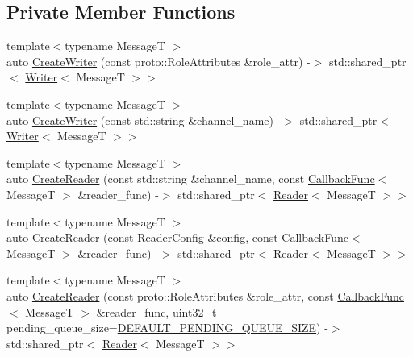 \subsection*{Private Member Functions}
\begin{DoxyCompactItemize}
\item 
{\footnotesize template$<$typename Message\-T $>$ }\\auto \hyperlink{classapollo_1_1cyber_1_1NodeChannelImpl_aa1befa9b25159bfd054258855d6287ef}{Create\-Writer} (const proto\-::\-Role\-Attributes \&role\-\_\-attr) -\/$>$ std\-::shared\-\_\-ptr$<$ \hyperlink{classapollo_1_1cyber_1_1Writer}{Writer}$<$ Message\-T $>$$>$
\item 
{\footnotesize template$<$typename Message\-T $>$ }\\auto \hyperlink{classapollo_1_1cyber_1_1NodeChannelImpl_ace079e0f685ee7a5b970c0e8a9ca187a}{Create\-Writer} (const std\-::string \&channel\-\_\-name) -\/$>$ std\-::shared\-\_\-ptr$<$ \hyperlink{classapollo_1_1cyber_1_1Writer}{Writer}$<$ Message\-T $>$$>$
\item 
{\footnotesize template$<$typename Message\-T $>$ }\\auto \hyperlink{classapollo_1_1cyber_1_1NodeChannelImpl_a4f0027a3b81bddc8f2c498998e00840e}{Create\-Reader} (const std\-::string \&channel\-\_\-name, const \hyperlink{namespaceapollo_1_1cyber_ac2b119de9ef52dbfcee3b6e8d497adc4}{Callback\-Func}$<$ Message\-T $>$ \&reader\-\_\-func) -\/$>$ std\-::shared\-\_\-ptr$<$ \hyperlink{classapollo_1_1cyber_1_1Reader}{Reader}$<$ Message\-T $>$$>$
\item 
{\footnotesize template$<$typename Message\-T $>$ }\\auto \hyperlink{classapollo_1_1cyber_1_1NodeChannelImpl_a61a53d4d924ce53cd294f704712187d7}{Create\-Reader} (const \hyperlink{structapollo_1_1cyber_1_1ReaderConfig}{Reader\-Config} \&config, const \hyperlink{namespaceapollo_1_1cyber_ac2b119de9ef52dbfcee3b6e8d497adc4}{Callback\-Func}$<$ Message\-T $>$ \&reader\-\_\-func) -\/$>$ std\-::shared\-\_\-ptr$<$ \hyperlink{classapollo_1_1cyber_1_1Reader}{Reader}$<$ Message\-T $>$$>$
\item 
{\footnotesize template$<$typename Message\-T $>$ }\\auto \hyperlink{classapollo_1_1cyber_1_1NodeChannelImpl_a8bb02d57241215c11db8bc70c2e034f7}{Create\-Reader} (const proto\-::\-Role\-Attributes \&role\-\_\-attr, const \hyperlink{namespaceapollo_1_1cyber_ac2b119de9ef52dbfcee3b6e8d497adc4}{Callback\-Func}$<$ Message\-T $>$ \&reader\-\_\-func, uint32\-\_\-t pending\-\_\-queue\-\_\-size=\hyperlink{namespaceapollo_1_1cyber_a2f6db02a0b926d2d76f73ce52c149047}{D\-E\-F\-A\-U\-L\-T\-\_\-\-P\-E\-N\-D\-I\-N\-G\-\_\-\-Q\-U\-E\-U\-E\-\_\-\-S\-I\-Z\-E}) -\/$>$ std\-::shared\-\_\-ptr$<$ \hyperlink{classapollo_1_1cyber_1_1Reader}{Reader}$<$ Message\-T $>$$>$
$$
\end{DoxyCompactItemize}

